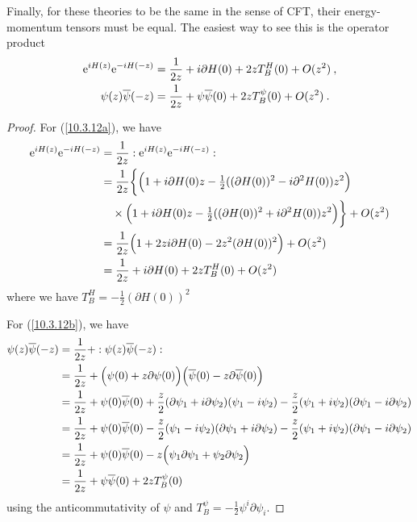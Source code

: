 	Finally, for these theories to be the same in the sense of CFT, their energy-momentum tensors must be equal. The easiest way to see this is the operator product
	\begin{subequations}
		\begin{align}
			\mathrm{e}^{i H(z)}\mathrm{e}^{-i H(-z)} &= \frac{1}{2z} + i\partial H(0)+2zT_{B}^{H}(0)+O(z^{2})\:, \label{10.3.12a} \\
			\psi(z)\overline{\psi}(-z) &= \frac{1}{2z} + \psi\overline{\psi}(0) +2zT_{B}^{\psi}(0) + O(z^{2}) \:. \label{10.3.12b}
		\end{align} \label{10.3.12}
	\end{subequations}
	\begin{tcolorbox}[breakable]
		\begin{proof}
		For (\ref{10.3.12a}), we have
		\begin{align*}
			\mathrm{e}^{i H(z)}\mathrm{e}^{-i H(-z)} &= \frac{1}{2z} :  \mathrm{e}^{i H(z)}\mathrm{e}^{-i H(-z)} : \\
			&= \frac{1}{2z} \biggl\{ \Bigl(1+i\partial H(0)z-\tfrac{1}{2}((\partial H(0))^{2} -i \partial^{2} H(0))z^{2}\Bigr)\\
			&\quad\times\Bigl(1+i\partial H(0)z-\tfrac{1}{2}((\partial H(0))^{2} +i \partial^{2} H(0))z^{2}\Bigr) \biggr\}
			+O(z^{2}) \\
			& =\frac{1}{2z}\Bigl(1+ 2zi\partial H(0)-2z^{2}(\partial H(0))^{2}\Bigr)+O(z^{2}) \\
			&=\frac{1}{2z} + i\partial H(0)+2zT_{B}^{H}(0)+O(z^{2})
		\end{align*} 
		where we have $T_{B}^{H}=-\tfrac{1}{2}(\partial H(0))^{2}$
		
		For (\ref{10.3.12b}), we have
		\begin{align*}
			\psi(z)\overline{\psi}(-z) &= \frac{1}{2z} + :\psi(z)\overline{\psi}(-z) : \\
			&= \frac{1}{2z} + \Bigl(\psi(0)+z\partial\psi(0)\Bigr) \Bigl(\overline{\psi}(0)-z\partial\overline{\psi}(0)\Bigr) \\
			&=\frac{1}{2z} +\psi(0)\overline{\psi}(0) +\frac{z}{2}(\partial\psi_{1}+i\partial\psi_{2})(\psi_{1}-i\psi_{2})
			-\frac{z}{2}(\psi_{1}+i\psi_{2})(\partial\psi_{1}-i\partial\psi_{2})\\
			&=\frac{1}{2z} +\psi(0)\overline{\psi}(0)-\frac{z}{2}(\psi_{1}-i\psi_{2})(\partial\psi_{1}+i\partial\psi_{2})
			-\frac{z}{2}(\psi_{1}+i\psi_{2})(\partial\psi_{1}-i\partial\psi_{2}) \\
			&= \frac{1}{2z} +\psi(0)\overline{\psi}(0)- z\Bigl(\psi_{1}\partial\psi_{1}+\psi_{2}\partial\psi_{2}\Bigr) \\
			&=\frac{1}{2z} + \psi\overline{\psi}(0) +2zT_{B}^{\psi}(0) 
		\end{align*}
		using the anticommutativity of $\psi$ and $T_{B}^{\psi}=-\frac{1}{2}\psi^{i}\partial\psi_{i}$.
		\end{proof}
	\end{tcolorbox}
